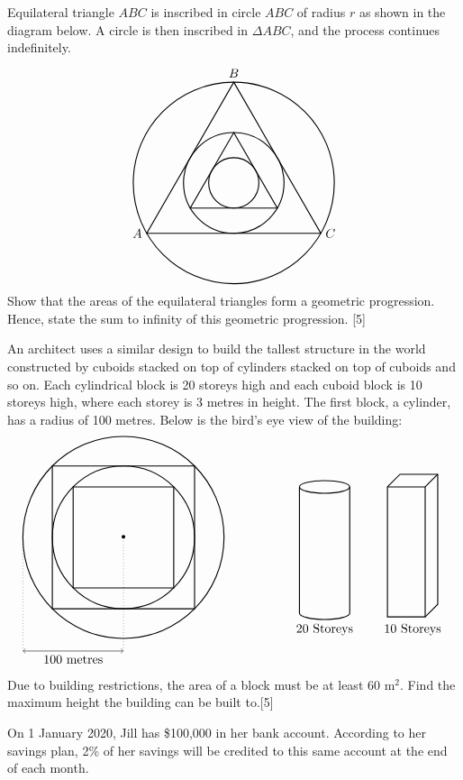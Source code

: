 \documentclass[12pt, a4 paper]{article}
\begin{document}
\begin{outline}[enumerate]
 \1 Equilateral triangle \(ABC\) is inscribed in circle \(ABC\) of radius \(r\) as shown in the diagram below. A circle is then inscribed in \(\Delta ABC\), and the process continues indefinitely. %
 \[
  \begin{tikzpicture}
   \draw[thick] (0,0) circle (80pt);
   \draw[thick] (0,80pt) node[above]{\(B\)} -- (69.282pt,-40pt) node[right]{\(C\)} -- (-69.282pt,-40pt) node[left]{\(A\)} -- cycle;
   \draw[thick] (0,0) circle (40pt);
   \draw[thick] (0,40pt) -- (34.641pt,-20pt) -- (-34.641pt,-20pt) -- cycle;
   \draw[thick] (0,0) circle (20pt);
  \end{tikzpicture}
 \]
 \2 Show that the areas of the equilateral triangles form a geometric progression. Hence, state the sum to infinity of this geometric progression. \hfill[5]

 \2 An architect uses a similar design to build the tallest structure in the world constructed by cuboids stacked on top of cylinders stacked on top of cuboids and so on. Each cylindrical block is 20 storeys high and each cuboid block is 10 storeys high, where each storey is 3 metres in height. The first block, a cylinder, has a radius of 100 metres. Below is the bird's eye view of the building:
 \[
  \begin{tikzpicture}
   \draw[<->] (-80pt,-90pt) -- (-40pt,-90pt)node[below]{100 metres} -- (0,-90pt);
   \draw[dotted] (-80pt,-90pt) -- (-80pt,0);
   \draw[dotted] (0pt,-90pt) -- (0,0);
   \draw[thick] (0,0) circle (80pt);
   \draw[thick] (56.5685pt,56.5685pt) -- (-56.5685pt,56.5685pt) --(-56.5685pt,-56.5685pt) -- (56.5685pt,-56.5685pt) -- cycle;
   \draw[thick] (0,0) circle (56.5685pt);
   \draw[thick] (40pt,40pt) -- (-40pt,40pt) --(-40pt,-40pt) -- (40pt,-40pt) -- cycle;
   \draw[thick] (160pt,40pt) ellipse (20pt and 5pt);
   \draw[thick] (140pt,40pt) -- (140pt,-60pt) arc (180:360:20pt and 5pt) -- (180pt,40pt);
   \draw[thick] (210pt,40pt) rectangle (240pt,-63pt);
   \draw[thick] (210pt,40pt) -- (220pt,50pt) -- (250pt,50pt) -- (250pt,-53pt) -- (240pt,-63pt);
   \draw[thick] (250pt,50pt) -- (240pt,40pt);
   \draw (160pt,-65pt) node[below]{20 Storeys};
   \draw (230pt,-65pt) node[below]{10 Storeys};
   \node at (0,0) {\textbullet};
  \end{tikzpicture}
 \]
 Due to building restrictions, the area of a block must be at least 60 m\(^2\). Find the maximum height the building can be built to.\hfill[5]

 \1 On 1 January 2020, Jill has \$100,000 in her bank account. According to her savings plan, 2\% of her savings will be credited to this same account at the end of each month. %


\end{outline}
\end{document}
